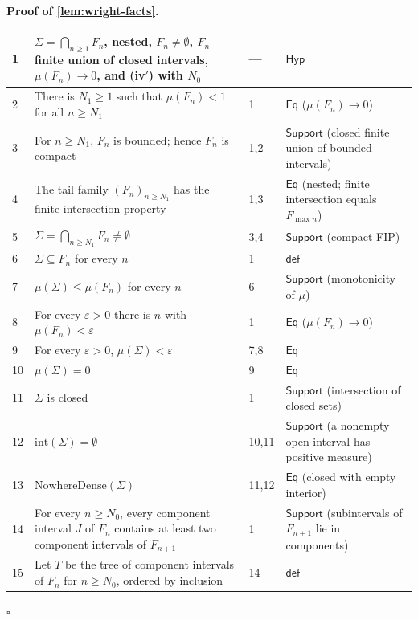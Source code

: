 \documentclass[11pt,reqno]{amsart}
\theoremstyle{blueplain}
\renewcommand{\qedsymbol}{\textcolor{proofqed}{\ensuremath{\square}}}
\renewenvironment{proof}[1][Proof]{\par\noindent\textbf{\textcolor{proofhead}{#1.}}\par\nobreak}{\par\nobreak\hfill\qedsymbol}
\numberwithin{equation}{section}
\begin{document}
\begin{proof}[\textbf{Proof of \cref{lem:wright-facts}}]
	\label{proof:lem:wright-facts}
	{\scriptsize
		\begin{tabular}{|m{0.7cm}|m{12cm}|m{1.4cm}|m{2.5cm}|}
			\hline
			1 & \(\Sigma=\bigcap_{n\ge1}F_n\), nested, \(F_n\ne\emptyset\), \(F_n\) finite union of closed intervals, \(\mu(F_n)\to0\), and (iv$'$) with \(N_0\) & --- & \(\mathsf{Hyp}\) \\ \hline
			2 & There is \(N_1\ge1\) such that \(\mu(F_n)<1\) for all \(n\ge N_1\) & 1 & \(\mathsf{Eq}\) (\(\mu(F_n)\to0\)) \\ \hline
			3 & For \(n\ge N_1\), \(F_n\) is bounded; hence \(F_n\) is compact & 1,2 & \(\mathsf{Support}\) (closed finite union of bounded intervals) \\ \hline
			4 & The tail family \((F_n)_{n\ge N_1}\) has the finite intersection property & 1,3 & \(\mathsf{Eq}\) (nested; finite intersection equals \(F_{\max n}\)) \\ \hline
			5 & \(\Sigma=\bigcap_{n\ge N_1}F_n\ne\emptyset\) & 3,4 & \(\mathsf{Support}\) (compact FIP) \\ \hline
			6 & \(\Sigma\subseteq F_n\) for every \(n\) & 1 & \(\mathsf{def}\) \\ \hline
			7 & \(\mu(\Sigma)\le\mu(F_n)\) for every \(n\) & 6 & \(\mathsf{Support}\) (monotonicity of \(\mu\)) \\ \hline
			8 & For every \(\varepsilon>0\) there is \(n\) with \(\mu(F_n)<\varepsilon\) & 1 & \(\mathsf{Eq}\) (\(\mu(F_n)\to0\)) \\ \hline
			9 & For every \(\varepsilon>0\), \(\mu(\Sigma)<\varepsilon\) & 7,8 & \(\mathsf{Eq}\) \\ \hline
			10 & \(\mu(\Sigma)=0\) & 9 & \(\mathsf{Eq}\) \\ \hline
			11 & \(\Sigma\) is closed & 1 & \(\mathsf{Support}\) (intersection of closed sets) \\ \hline
			12 & \(\mathrm{int}(\Sigma)=\emptyset\) & 10,11 & \(\mathsf{Support}\) (a nonempty open interval has positive measure) \\ \hline
			13 & \(\mathrm{NowhereDense}(\Sigma)\) & 11,12 & \(\mathsf{Eq}\) (closed with empty interior) \\ \hline
			14 & For every \(n\ge N_0\), every component interval \(J\) of \(F_n\) contains at least two component intervals of \(F_{n+1}\) & 1 & \(\mathsf{Support}\) (subintervals of \(F_{n+1}\) lie in components) \\ \hline
			15 & Let \(T\) be the tree of component intervals of \(F_n\) for \(n\ge N_0\), ordered by inclusion & 14 & \(\mathsf{def}\) \\ \hline

\end{tabular}}
\end{proof}
\end{document}
